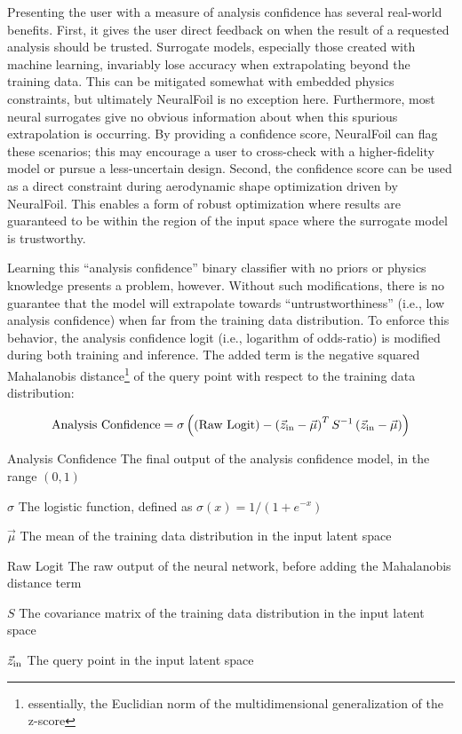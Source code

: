 Presenting the user with a measure of analysis confidence has several real-world benefits. First, it gives the user direct feedback on when the result of a requested analysis should be trusted. Surrogate models, especially those created with machine learning, invariably lose accuracy when extrapolating beyond the training data. This can be mitigated somewhat with embedded physics constraints, but ultimately NeuralFoil is no exception here. Furthermore, most neural surrogates give no obvious information about when this spurious extrapolation is occurring. By providing a confidence score, NeuralFoil can flag these scenarios; this may encourage a user to cross-check with a higher-fidelity model or pursue a less-uncertain design. Second, the confidence score can be used as a direct constraint during aerodynamic shape optimization driven by NeuralFoil. This enables a form of robust optimization where results are guaranteed to be within the region of the input space where the surrogate model is trustworthy.

Learning this ``analysis confidence'' binary classifier with no priors or physics knowledge presents a problem, however. Without such modifications, there is no guarantee that the model will extrapolate towards ``untrustworthiness'' (i.e., low analysis confidence) when far from the training data distribution. To enforce this behavior, the analysis confidence logit (i.e., logarithm of odds-ratio) is modified during both training and inference. The added term is the negative squared Mahalanobis distance\footnote{essentially, the Euclidian norm of the multidimensional generalization of the z-score} of the query point with respect to the training data distribution:

\begin{equation}
    \text{Analysis Confidence} = \sigma
    \left(
    \left(\text{Raw Logit}\right) -
    \left( \vec{z}_{\rm in} - \vec\mu \right) ^ T
    S ^{-1}
    \left( \vec{z}_{\rm in} - \vec\mu \right)
    \right)
    \label{eq:uq}
\end{equation}

\begin{eqexpl}[30mm]
    \item{Analysis Confidence} The final output of the analysis confidence model, in the range $(0, 1)$
    \item{$\sigma$} The logistic function, defined as $\sigma(x) = 1 / (1 + e^{-x})$
    \item{$\vec\mu$} The mean of the training data distribution in the input latent space
    \item{Raw Logit} The raw output of the neural network, before adding the Mahalanobis distance term
    \item{$S$} The covariance matrix of the training data distribution in the input latent space
    \item{$\vec{z}_{\rm in}$} The query point in the input latent space
\end{eqexpl}

